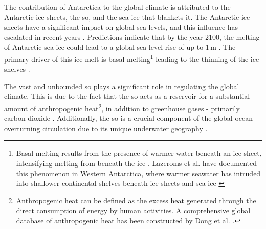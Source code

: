 The contribution of Antarctica to the global climate is attributed to the Antarctic ice sheets, the \acs{so}, and the sea ice that blankets it. The Antarctic ice sheets have a significant impact on global sea levels, and this influence has escalated in recent years \cite{Kennicut2019}. Predictions indicate that by the year 2100, the melting of Antarctic sea ice could lead to a global sea-level rise of up to 1\,m \cite{Bronselaer2018}. The primary driver of this ice melt is basal melting\footnote{Basal melting results from the presence of warmer water beneath an ice sheet, intensifying melting from beneath the ice \cite{Gamache2015}. Lazeroms et al. have documented this phenomenon in Western Antarctica, where warmer seawater has intruded into shallower continental shelves beneath ice sheets and sea ice \cite{Lazeroms2018}} leading to the thinning of the ice shelves \cite{Kennicut2019}.


The vast and unbounded \acs{so} plays a significant role in regulating the global climate. This is due to the fact that the \acs{so} acts as a reservoir for a substantial amount of anthropogenic heat\footnote{Anthropogenic heat can be defined as the excess heat generated through the direct consumption of energy by human activities. A comprehensive global database of anthropogenic heat has been constructed by Dong et al. \cite{Dong2017}.}, in addition to greenhouse gases - primarily carbon dioxide \cite{Kennicut2019}. Additionally, the \acs{so} is a crucial component of the global ocean overturning circulation due to its unique underwater geography \cite{Thomas2017Chap8}.


